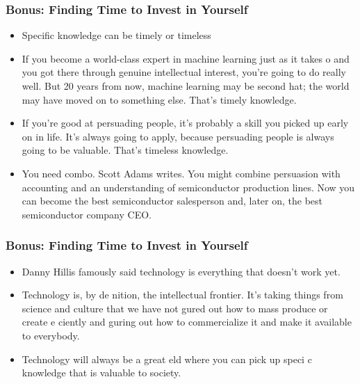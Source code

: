 \begin{frame}[fragile]
\frametitle{Bonus: Finding Time to Invest in Yourself}
\begin{itemize}
\item Specific knowledge can be timely or timeless
\item If you become a world-class expert in machine learning just as it takes o  and you got there through
genuine intellectual interest, you’re going to do really well. But 20 years from now, machine learning may
be second hat; the world may have moved on to something else. That’s timely knowledge.
\item If you’re good at persuading people, it’s probably a skill you picked up early on in life. It’s always going to
apply, because persuading people is always going to be valuable. That’s timeless knowledge.
\item You need combo. Scott Adams writes. You might combine persuasion with accounting and an
understanding of semiconductor production lines. Now you can become the best semiconductor
salesperson and, later on, the best semiconductor company CEO.

\end{itemize}
\end{frame}

\begin{frame}[fragile]
\frametitle{Bonus: Finding Time to Invest in Yourself}
\begin{itemize}
\item Danny Hillis famously said technology is everything that doesn’t work yet.
\item Technology is, by de nition, the intellectual frontier. It’s taking things from science and culture that we
have not  gured out how to mass produce or create e ciently and  guring out how to commercialize it
and make it available to everybody.
\item Technology will always be a great  eld where you can pick up speci c knowledge that is valuable to
society.
\end{itemize}
\end{frame}

